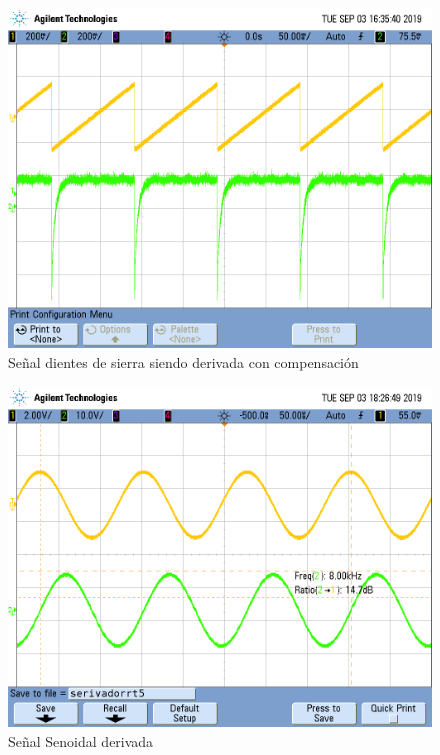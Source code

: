 \begin{figure}[H]
	\centering
	\includegraphics[width=\textwidth]{Ejercicio4/FOTOS-TP2-TC-EJ4/derivador1}
	\caption{Señal dientes de sierra siendo derivada con compensación}
\end{figure}

\begin{figure}[H]
	\centering
	\includegraphics[width=\textwidth]{Ejercicio4/FOTOS-TP2-TC-EJ4/serivadorrt5}
	\caption{Señal Senoidal derivada}
\end{figure}

